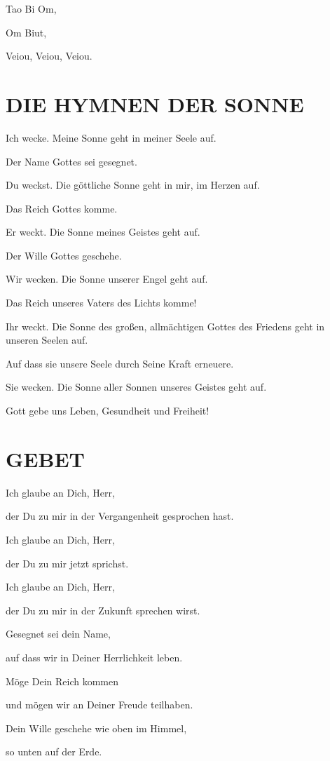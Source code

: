 \documentclass[11pt,a5paper,twoside]{article}
\begin{document}
Tao Bi Om,
 
Om Biut,

Veiou, Veiou, Veiou.

\section[Hymnen der Sonne]{DIE HYMNEN DER SONNE}

Ich wecke. Meine Sonne geht in meiner Seele auf.

Der Name Gottes sei gesegnet.

Du weckst. Die göttliche Sonne geht in mir, im Herzen auf.


Das Reich Gottes komme.

Er weckt. Die Sonne meines Geistes geht auf.

Der Wille Gottes geschehe.

Wir wecken. Die Sonne unserer Engel geht auf.

Das Reich unseres Vaters des Lichts komme!

Ihr weckt. Die Sonne des großen, allmächtigen Gottes des
Friedens geht in unseren Seelen auf.


Auf dass sie unsere Seele durch Seine Kraft erneuere.

Sie wecken. Die Sonne aller Sonnen unseres Geistes geht auf.

Gott gebe uns Leben, Gesundheit und Freiheit!


\section[Gebet]{GEBET}

Ich glaube an Dich, Herr,

der Du zu mir in der Vergangenheit gesprochen hast.

Ich glaube an Dich, Herr,

der Du zu mir jetzt sprichst.


Ich glaube an Dich, Herr,

der Du zu mir in der Zukunft sprechen wirst.

Gesegnet sei dein Name,

auf dass wir in Deiner Herrlichkeit leben. 

Möge Dein Reich kommen

und mögen wir an Deiner Freude teilhaben. 

Dein Wille geschehe wie oben im Himmel,

so unten auf der Erde. 
\end{document}
